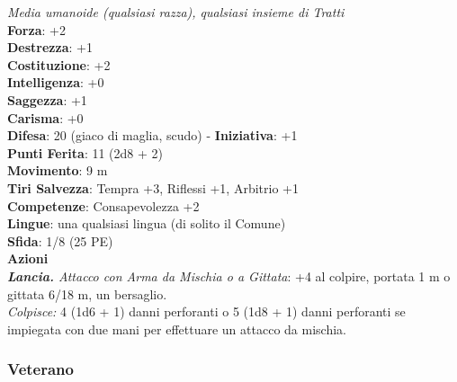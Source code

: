 \begin{multicols}{2}
\emph{Media umanoide (qualsiasi razza), qualsiasi insieme di Tratti}\\
\textbf{Forza}: +2\\
\textbf{Destrezza}: +1\\
\textbf{Costituzione}: +2\\
\textbf{Intelligenza}: +0\\
\textbf{Saggezza}: +1\\
\textbf{Carisma}: +0\\
\textbf{Difesa}: 20 (giaco di maglia, scudo) - \textbf{Iniziativa}: +1\\
\textbf{Punti Ferita}: 11 (2d8 + 2)\\
\textbf{Movimento}: 9 m\\
\textbf{Tiri Salvezza}: Tempra +3, Riflessi +1, Arbitrio +1 \\
\textbf{Competenze}: Consapevolezza +2\\
\textbf{Lingue}: una qualsiasi lingua (di solito il Comune)\\
\textbf{Sfida}: 1/8 (25 PE)\smallskip\\
\smallskip\textbf{Azioni}\\
\emph{\textbf{Lancia.} Attacco con Arma da Mischia o a Gittata}: +4 al colpire, portata 1 m o gittata 6/18 m, un bersaglio.\\
\emph{Colpisce:} 4 (1d6 + 1) danni perforanti o 5 (1d8 + 1) danni perforanti se impiegata con due mani per effettuare un attacco da mischia.\\

\subsubsection{Veterano}


\end{multicols}
